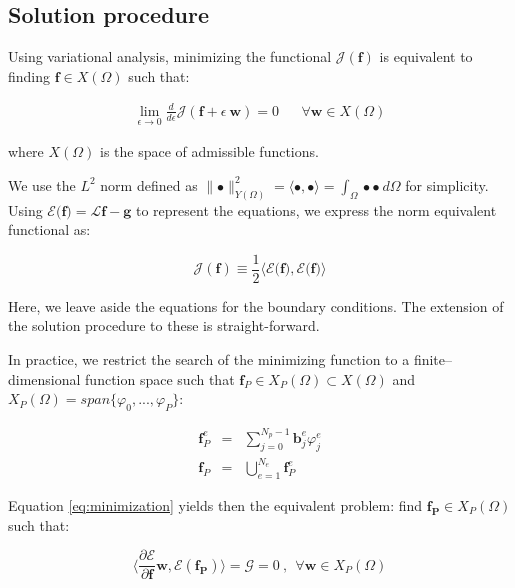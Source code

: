 \documentclass{CFD2011}
\begin{document}
\subsection{Solution procedure}
Using variational analysis, minimizing the functional $\mathcal{J}(\mathbf{f})$ is equivalent to finding $\mathbf{f} \in X(\Omega)$ such that:

\begin{eqnarray}
\lim_{\epsilon \to 0} \frac{d}{d\epsilon}{\mathcal{J}(\mathbf{f}+\epsilon \ \mathbf{w})}=0 && \forall \mathbf{w} \in X(\Omega)
\label{eq:minimization}
\end{eqnarray}

\noindent where $X(\Omega)$ is the space of admissible functions.

We use the $L^2$ norm defined as $\parallel \bullet  \parallel_{Y(\Omega)}^2= \langle \bullet, \bullet \rangle= \int_\Omega  \bullet \bullet   \ d\Omega$ for simplicity. Using $\mathcal{E} {(}\mathbf{f} {)}=\mathcal{L}\mathbf{f}-\mathbf{g}$ to represent the equations, we express the norm equivalent functional as:

\begin{equation}
\mathcal{J}(\mathbf{f})\equiv  \frac{1}{2} \langle \mathcal{E} {(}\mathbf{f} {)},\mathcal{E} {(}\mathbf{f} {)} \rangle
\end{equation}

Here, we leave aside the equations for the boundary conditions. The extension of the solution procedure to these is straight-forward. 

In practice, we restrict the search of the minimizing function to a finite--dimensional function space such that $\mathbf{f}_P \in X_P(\Omega) \subset X(\Omega)$ and $X_P(\Omega)= span\{ \varphi_0,...,\varphi_P \} $:

\begin{eqnarray}
\mathbf{f}_P^e&=&\sum_{j=0}^{N_p-1} \mathbf{b}_j^e \varphi_j^e \label{eq:suma} \\
\mathbf{f}_P&=&\bigcup _{e=1}^{N_e}\mathbf{f}_P^e
\end{eqnarray}


Equation \ref{eq:minimization} yields then the equivalent problem: find $\mathbf{f_P} \in X_P(\Omega)$ such that:

\begin{equation}
\big\langle \frac{\partial\mathcal{E}}{\partial \mathbf{f}}\mathbf{w} , \mathcal{E}(\mathbf{f_P}) \big\rangle=\mathcal{G}=0 \ ,\ \ \forall \mathbf{w}\in X_P(\Omega)
\end{equation}
\end{document}
